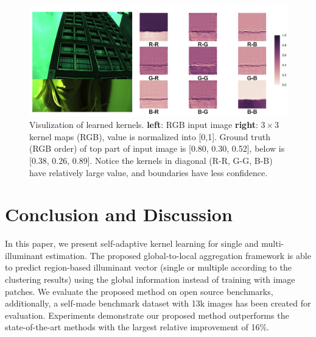 \documentclass[10pt,twocolumn,letterpaper]{article}
\begin{document}
\begin{figure}[t]
\begin{center}
   \includegraphics[width=\linewidth]{../Images/vis_kernel.png}
\end{center}
   \caption{
    Visulization of learned kernels. \textbf{left}: RGB input image \textbf{right}: $3{\times}3$ kernel maps (RGB),
    value is normalized into [0,1].
    Ground truth (RGB order) of top part of input image is [0.80, 0.30, 0.52], below is [0.38, 0.26, 0.89].
    Notice the kernels in diagonal (R-R, G-G, B-B) have relatively large value,
    and boundaries have less confidence.
    }
\label{fig:vis_kernel}
\end{figure}



\section{Conclusion and Discussion}
\label{section_c_and_d}
In this paper, we present self-adaptive kernel learning for single and multi-illuminant estimation.
The proposed global-to-local aggregation framework is able to predict region-based illuminant vector
(single or multiple according to the clustering results) using
the global information instead of training with image patches.
We evaluate the proposed method on open source benchmarks, additionally,
a self-made benchmark dataset with 13k images has been created for evaluation.
Experiments demonstrate our proposed method outperforms the state-of-the-art methods with the largest relative improvement of 16\%.
\end{document}
